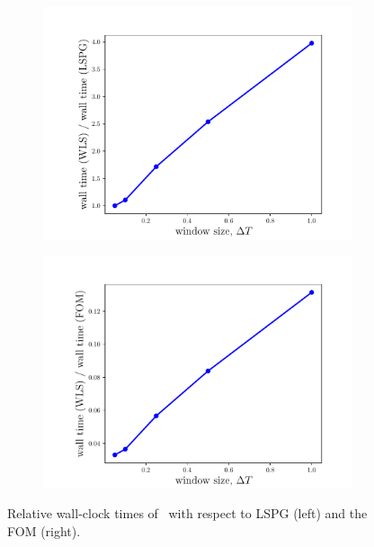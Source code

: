 \begin{figure}
\begin{center}
\begin{subfigure}[t]{0.45\textwidth}
\includegraphics[trim={0cm 0cm 0cm 0cm},clip,width=1.0\linewidth]{figs/cavity_new/walltime_vs_windowSize.pdf}
\end{subfigure}
\begin{subfigure}[t]{0.45\textwidth}
\includegraphics[trim={0cm 0cm 0cm 0cm},clip,width=1.0\linewidth]{figs/cavity_new/rel_walltime_vs_windowSize.pdf}
\end{subfigure}
\caption{Relative wall-clock times of \methodAcronymROMs\ with respect to LSPG (left) and the FOM (right).}
\label{fig:cav_wallclock}
\end{center}
\end{figure}


